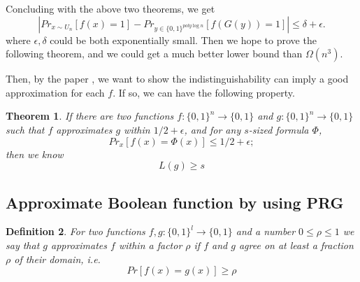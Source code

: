 \documentclass[12pt]{article}
\newtheorem{theorem}{Theorem}[section]
\newtheorem{definition}[theorem]{Definition}
\renewcommand{\.}{,\ldots,}
\begin{document}
Concluding with the above two theorems, we get 
$$|Pr_{x\sim U_n}[f(x)=1]-Pr_{y\in\{0,1\}^{poly\log n}}[f(G(y))=1]|\leq \delta+\epsilon.$$
where $\epsilon, \delta$ could be both exponentially small. Then we hope to prove the following theorem, and we could get a much better lower bound than $\Omega(n^3)$.

Then, by the paper \cite{trevisan2009regularity}, we want to show the indistinguishability can imply a good approximation for each $f$. If so, we can have the following property. 

\begin{theorem}
	If there are two functions $f:\{0,1\}^n\rightarrow \{0,1\}$ and $g:\{0,1\}^{ n}\rightarrow \{0,1\}$ such that $f$ approximates $g$ within $1/2+\epsilon$, and for any $s$-sized formula $\Phi$, $$Pr_x[f(x)=\Phi(x)]\leq 1/2+\epsilon;$$
	then  we know
	$$L(g)\geq s$$
\end{theorem}


%
%
%
%

\subsection{Approximate Boolean function by using PRG}
\begin{definition}
For two functions $f, g : \{0, 1\}^l \rightarrow \{0, 1\}$ and a number $0 \le \rho \leq 1$ we say that $g$
approximates $f$ within a factor $\rho$ if $f$ and $g$ agree on at least a fraction $\rho$ of their
domain, i.e.$$ Pr[f(x) = g(x)] \geq  \rho$$
\end{definition}
\end{document}
